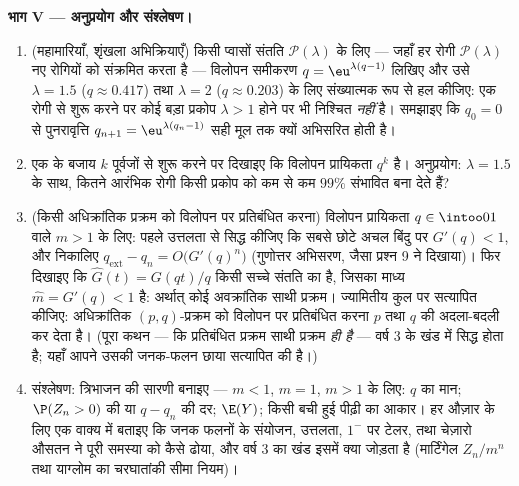 \begin{problem}
\medskip
\noindent\textbf{भाग V --- अनुप्रयोग और संश्लेषण।}
\begin{enumerate}[resume]
  \item (महामारियाँ, शृंखला अभिक्रियाएँ) किसी प्वासों संतति 
        $\mathcal P(\lambda)$ के लिए --- जहाँ हर रोगी $\mathcal P(\lambda)$ नए रोगियों को संक्रमित
        करता है --- विलोपन समीकरण $q = \eu^{\lambda(q-1)}$ लिखिए और उसे $\lambda = 1.5$ ($q \approx
        0.417$)
        तथा $\lambda = 2$ ($q \approx 0.203$) के लिए संख्यात्मक रूप से हल कीजिए: एक
        रोगी से शुरू करने पर कोई बड़ा प्रकोप $\lambda > 1$ होने पर भी
        निश्चित \emph{नहीं} है। समझाइए कि $q_0 = 0$ से पुनरावृत्ति
        $q_{n+1} = \eu^{\lambda(q_n - 1)}$ सही मूल तक क्यों अभिसरित होती है।
  \item एक के बजाय $k$ पूर्वजों से शुरू करने पर दिखाइए कि
        विलोपन प्रायिकता $q^k$ है। अनुप्रयोग: $\lambda = 1.5$ के साथ,
        कितने आरंभिक रोगी किसी प्रकोप को कम से कम $99\%$ संभावित
        बना देते हैं?
  \item (किसी अधिक्रांतिक प्रक्रम को विलोपन पर प्रतिबंधित करना)
        विलोपन प्रायिकता $q \in
        \intoo01$ वाले $m > 1$ के लिए: पहले उत्तलता से
        सिद्ध कीजिए कि सबसे छोटे अचल बिंदु पर $G'(q) < 1$, और निकालिए
        $q_{\mathrm{ext}} - q_n = O\bigl(G'(q)^n\bigr)$
        (गुणोत्तर अभिसरण, जैसा प्रश्न 9 ने दिखाया)। फिर दिखाइए
        कि $\widehat G(t) = G(qt)/q$ किसी सच्चे संतति  का  है, जिसका माध्य
        $\widehat m =
        G'(q) < 1$ है: अर्थात् कोई अवक्रांतिक साथी प्रक्रम। ज्यामितीय
        कुल पर सत्यापित कीजिए: अधिक्रांतिक $(p, q)$-प्रक्रम को
        विलोपन पर प्रतिबंधित करना $p$ तथा $q$ की अदला-बदली कर
        देता है। (पूरा कथन --- कि प्रतिबंधित प्रक्रम साथी
        प्रक्रम \emph{ही है} --- वर्ष 3 के खंड में सिद्ध होता
        है; यहाँ आपने उसकी जनक-फलन छाया सत्यापित की है।)
  \item संश्लेषण: त्रिभाजन की सारणी बनाइए --- $m <
        1$, $m = 1$, $m > 1$
        के लिए: $q$ का मान; $\P(Z_n >
        0)$ की या $q - q_n$ की दर; $\E(Y)$; किसी
        बची हुई पीढ़ी का आकार। हर औज़ार के लिए एक वाक्य में
        बताइए कि जनक फलनों के संयोजन, उत्तलता, $1^-$ पर टेलर, तथा
        चेज़ारो औसतन ने पूरी समस्या को कैसे ढोया, और वर्ष 3 का
        खंड इसमें क्या जोड़ता है (मार्टिंगेल $Z_n/m^n$ तथा याग्लोम
        का चरघातांकी सीमा नियम)।
\end{enumerate}
\end{problem}
